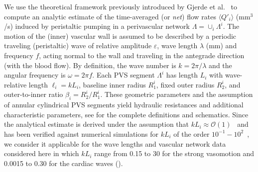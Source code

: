 \documentclass[fleqn,10pt]{wlscirep}
\begin{document}
We use the theoretical framework previously introduced by Gjerde et al.~\cite{gjerde2023directional} to compute an analytic estimate of the time-averaged (or \emph{net}) flow rates $\langle Q'_i \rangle$ (mm$^3$/s) induced by peristaltic pumping in a perivascular network $\Lambda = \cup_i \Lambda^i$. The motion of the (inner) vascular wall is assumed to be described by a periodic traveling (peristaltic) wave of relative amplitude $\varepsilon$, wave length $\lambda$ (mm) and frequency $f$, acting normal to the wall and traveling in the antegrade direction (with the blood flow). By definition, the wave number is $k = 2 \pi/\lambda$ and the angular frequency is $\omega = 2 \pi f$. Each PVS segment $\Lambda^i$ has length $L_i$ with wave-relative length $\ell_i = k L_i$, baseline inner radius $R_1^i$, fixed outer radius $R_2^i$, and outer-to-inner ratio $\beta_i = R_2^i/R_1^i$. These geometric parameters and the assumption of annular cylindrical PVS segments yield hydraulic resistances and additional characteristic parameters, see \cite{gjerde2023directional} for the complete definitions and schematics. Since the analytical estimate is derived under the assumption that $k L_i \approx \mathcal{O} (1)$~\cite{gjerde2023directional} and has been verified against numerical simulations for $k L_i$ of the order $10^{-1}-10^2$~\cite[Table I]{gjerde2023directional}, we consider it applicable for the wave lengths and vascular network data considered here in which $k L_i$ range from 0.15 to 30 for the strong vasomotion and 0.0015 to 0.30 for the cardiac waves ().
\end{document}
